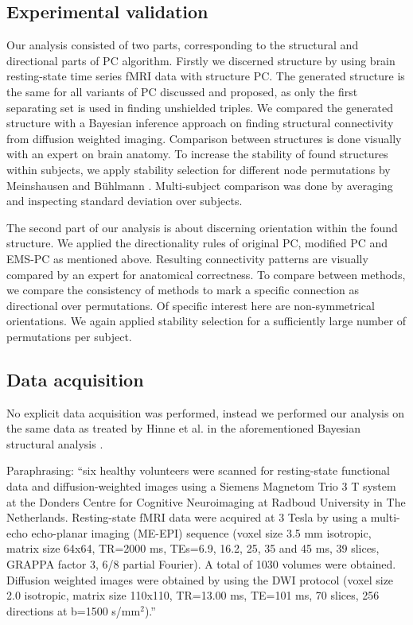 \documentclass[a4paper, 10pt, english, onecolumn]{article}
\begin{document}

\subsection{Experimental validation}
Our analysis consisted of two parts, corresponding to the structural and directional parts of PC algorithm.
Firstly we discerned structure by using brain resting-state time series fMRI data with structure PC.
The generated structure is the same for all variants of PC discussed and proposed, as only the first separating set is used in finding unshielded triples.
We compared the generated structure with a Bayesian inference approach on finding structural connectivity from diffusion weighted imaging.
Comparison between structures is done visually with an expert on brain anatomy.
To increase the stability of found structures within subjects, we apply stability selection for different node permutations by Meinshausen and B{\"u}hlmann \cite{meinshausen2010}.
Multi-subject comparison was done by averaging and inspecting standard deviation over subjects.

The second part of our analysis is about discerning orientation within the found structure.
We applied the directionality rules of original PC, modified PC and EMS-PC as mentioned above.
Resulting connectivity patterns are visually compared by an expert for anatomical correctness.
To compare between methods, we compare the consistency of methods to mark a specific connection as directional over permutations.
Of specific interest here are non-symmetrical orientations.
We again applied stability selection for a sufficiently large number of permutations per subject.

\subsection{Data acquisition}
No explicit data acquisition was performed, instead we performed our analysis on the same data as treated by Hinne et al. in the aforementioned Bayesian structural analysis \cite{hinne2013, hinne2013structfunc}.

Paraphrasing: ``six healthy volunteers were scanned for resting-state functional data and diffusion-weighted images using a Siemens Magnetom Trio 3 T system at the Donders Centre for Cognitive Neuroimaging at Radboud University in The Netherlands.
Resting-state fMRI data were acquired at 3 Tesla by using a multi-echo echo-planar imaging (ME-EPI) sequence (voxel size 3.5 mm isotropic, matrix size 64x64, TR=2000 ms, TEs=6.9, 16.2, 25, 35 and 45 ms, 39 slices, GRAPPA factor 3, 6/8 partial Fourier).
A total of 1030 volumes were obtained.
Diffusion weighted images were obtained by using the DWI protocol (voxel size 2.0 isotropic, matrix size 110x110, TR=13.00 ms, TE=101 ms, 70 slices, 256 directions at b=1500 s/mm$^2$).''
\end{document}
